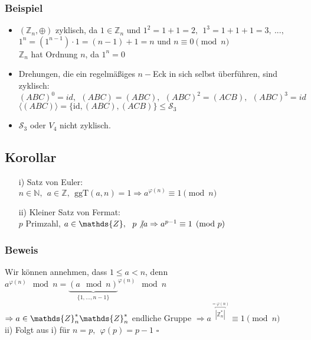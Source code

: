 \documentclass[a4paper, 12pt,titlepage, pdf, headsepline]{scrartcl}
\newcommand{\id}{\textrm{id}}
\renewcommand{\>}{\rightarrow}
\renewcommand{\*}{\cdot}
\renewcommand{\phi}{\varphi}
\begin{document}
	      \subsubsection*{Beispiel}
	      \begin{itemize}
	      	\item $(\mathds{Z}_n, \oplus)$ zyklisch, da $1 \in \mathds{Z}_n$ und $1^2 = 1 + 1 = 2,~~ 1^3 = 1 + 1 +1 = 3,~...,$\\$ 1^n = (1^{n-1}) \cdot 1 = (n -1) + 1 = n\textrm{ und } n \equiv 0 \pmod{n}$ \\
	      	      $\mathds{Z}_n$ hat Ordnung $n$, da $1^n = 0$
	      	\item Drehungen, die ein regelmäßiges $n-$Eck in sich selbst überführen, sind zyklisch: \\
	      	      $(ABC)^0 = id,~~ (ABC) = (ABC),~~ (ABC)^2 = (ACB),~~ (ABC)^3 = id$\\
	      	      $\langle (ABC) \rangle = \{\id, (ABC), (ACB)\} \leq \mathscr{S}_3$
	      	\item $\mathscr{S}_3$ oder $V_4$ nicht zyklisch.
	      \end{itemize}
	      \subsection{Korollar}
	      \begin{itemize}
	      	\item[i)] Satz von Euler:\\ $n \in \mathds{N},~~ a \in \mathds{Z},~~ \text{ggT}(a,n) = 1 \Rightarrow a^{\phi(n)} \equiv 1 \pmod{n}$
	      	\item[ii)] Kleiner Satz von Fermat:\\ $p$ Primzahl, $a \in \mathds{Z},~~ p \not\vert a \Rightarrow a^{p-1} \equiv 1 \pmod{p}$
	      \end{itemize}
	      \subsubsection*{Beweis}
	      Wir können annehmen, dass $1 \leq a < n$, denn \\$a^{\phi(n)} \mod n = {\underbrace{(a \mod n)}_{\{1,...,n-1\}}}^{\phi(n)}\mod n$ \\
	      $\Rightarrow a \in \mathds{Z}^*_n \\
	      \mathds{Z}^*_n$ endliche Gruppe $\Rightarrow a^{\overbracket{|\mathds{Z}^*_n|}^{ = \phi(n)}} \equiv 1 \pmod{n}$\\
	      ii) Folgt aus i) für $n = p,~~ \phi(p) = p-1$
	      \hfill$\square$
	      \newpage
\end{document}
